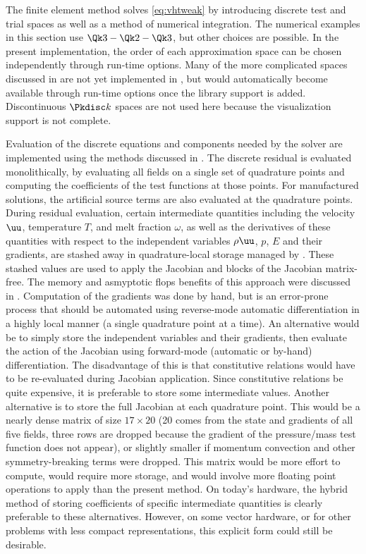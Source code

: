 The finite element method solves \eqref{eq:vhtweak} by introducing discrete test and trial spaces as well as a method of numerical integration.
The numerical examples in this section use $\Qk 3 - \Qk 2 - \Qk 3$, but other choices are possible.
In the present implementation, the order of each approximation space can be chosen independently through run-time options.
Many of the more complicated spaces discussed in  are not yet implemented in {\Dohp}, but would automatically become available through run-time options once the library support is added.
Discontinuous $\Pkdisc k$ spaces are not used here because the visualization support is not complete.

Evaluation of the discrete equations and components needed by the solver are implemented using the methods discussed in .
The discrete residual is evaluated monolithically, by evaluating all fields on a single set of quadrature points and computing the coefficients of the test functions at those points.
For manufactured solutions, the artificial source terms are also evaluated at the quadrature points.
During residual evaluation, certain intermediate quantities including the velocity $\uu$, temperature $T$, and melt fraction $\omega$, as well as the derivatives of these quantities with respect to the independent variables $\rho\uu$, $p$, $E$ and their gradients, are stashed away in quadrature-local storage managed by {\Dohp}.
These stashed values are used to apply the Jacobian and blocks of the Jacobian matrix-free.
The memory and asmyptotic flops benefits of this approach were discussed in .
Computation of the gradients was done by hand, but is an error-prone process that should be automated using reverse-mode automatic differentiation in a highly local manner (a single quadrature point at a time).
An alternative would be to simply store the independent variables and their gradients, then evaluate the action of the Jacobian using forward-mode (automatic or by-hand) differentiation.
The disadvantage of this is that constitutive relations would have to be re-evaluated during Jacobian application.
Since constitutive relations be quite expensive, it is preferable to store some intermediate values.
Another alternative is to store the full Jacobian at each quadrature point.
This would be a nearly dense matrix of size $17\times 20$ (20 comes from the state and gradients of all five fields, three rows are dropped because the gradient of the pressure/mass test function does not appear), or slightly smaller if momentum convection and other symmetry-breaking terms were dropped.
This matrix would be more effort to compute, would require more storage, and would involve more floating point operations to apply than the present method.
On today's hardware, the hybrid method of storing coefficients of specific intermediate quantities is clearly preferable to these alternatives.
However, on some vector hardware, or for other problems with less compact representations, this explicit form could still be desirable.


